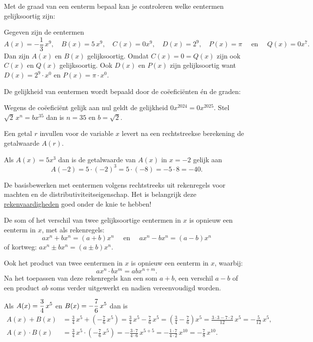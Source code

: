 \documentclass{ximera}
\begin{document}
Met de graad van een eenterm bepaal kan je controleren welke eentermen gelijksoortig zijn: 
\begin{example} 
Gegeven zijn de eentermen
\[
A(x) = -\frac{1}{3}\,x^9, \quad B(x) = 5\,x^9, \quad C(x) = 0x^9, \quad D(x) = 2^9, \quad P(x) = \pi \quad \text{ en } \quad Q(x) = 0 x^7.
\]
Dan zijn $A(x)$ en $B(x)$ gelijksoortig. Omdat $C(x) = 0 = Q(x)$ zijn ook $C(x)$ en $Q(x)$ gelijksoortig. 
Ook $D(x)$ en $P(x)$ zijn gelijksoortig want $D(x) = 2^9 \cdot x^0$ en $P(x) = \pi \cdot x^0$.  
\end{example} 

De gelijkheid van eentermen wordt bepaald door de coëeficiënten én de graden: 
\begin{example} 
Wegens de coëeficiënt gelijk aan nul geldt de gelijkheid $0x^{2024} = 0x^{2025}$. Stel $\sqrt{2}\,x^n = bx^{35}$ dan is $n = 35$ en $b = \sqrt{2}$.
\end{example} 


Een getal \(r\) invullen voor de variable \(x\) levert na een rechtstreekse berekening de getalwaarde $A(r)$. 
\begin{example} 
Als $A(x) = 5x^3$ dan is de getalwaarde van $A(x)$ in $x = -2$ gelijk aan 
\[
A(-2) = 5 \cdot (-2)^3 = 5 \cdot (-8) = - 5 \cdot 8 = -40.
\]
\end{example} 



De basisbewerken met eentermen volgens rechtstreeks uit rekenregels voor machten en de distributiviteitseigenschap. Het is belangrijk deze \href{https://wiskunde.opmaat.org/wiskundeplan/rekenvaardigheden/rekenvaardigheden/rekenvaardigheden_inleiding}{rekenvaardigheden} goed onder de knie te hebben!  


\begin{proposition}
	
De som of het verschil van twee gelijksoortige eentermen in $x$ is opnieuw een eenterm in $x$, met als rekenregels:
\[
ax^n + bx^n = (a+b)x^n \quad \text{ en } \quad ax^n - bx^n = (a-b)x^n
\]
of kortweg: $ax^n \pm bx^n = (a\pm b)x^n$. 

Ook het product van twee eentermen in $x$ is opnieuw een eenterm in $x$, waarbij:
\[
ax^n \cdot bx^m = abx^{n+m}.
\]
Na het toepassen van deze rekenregels kan een som $a+b$, een verschil $a-b$ of een product $ab$ soms verder uitgewerkt en nadien vereenvoudigd worden.

\end{proposition}


\begin{example} 
Als $\displaystyle A(x) = \frac{3}{4}\,x^5$ en $\displaystyle B(x) = -\frac{7}{6}\,x^5$ dan is 
\begin{align*}
A(x) + B(x) & = \frac{3}{4}\,x^5 + \left(-\frac{7}{6}\,x^5\right) 
= \frac{3}{4}\,x^5 - \frac{7}{6}\,x^5
= \left(\frac{3}{4} - \frac{7}{6}\right)x^5 
= \frac{3 \cdot 3 - 7 \cdot 2}{12}\,x^5 
= -\frac{5}{12}\,x^5, \\
A(x) \cdot B(x) & = \frac{3}{4}\,x^5 \cdot \left(-\frac{7}{6}\,x^5\right) = - \frac{3 \cdot 7}{4 \cdot 6}\,x^{5+5} = -\frac{1\cdot 7}{4 \cdot 2}\, x^{10} = -\frac{7}{8}\,x^{10}. 
\end{align*}
\end{example}
\end{document}
